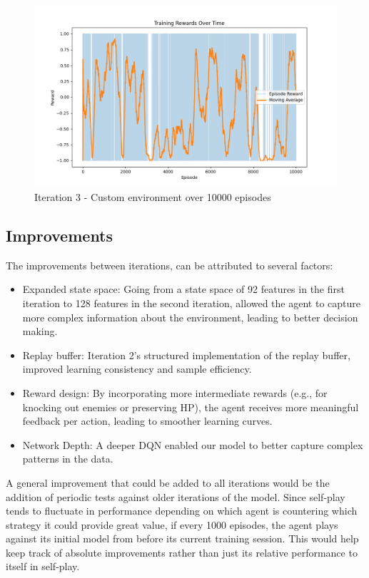 \begin{figure}[H]
    \centering
    \includegraphics[width=\textwidth]{assets/iteration-3-10k-rewards.png}
    \caption{Iteration 3 - Custom environment over 10000 episodes}
    \label{fig:iteration-3-graph}
\end{figure}

\subsection{Improvements}
The improvements between iterations, can be attributed to several factors:
\begin{itemize}
    \item Expanded state space: Going from a state space of 92 features in the first iteration
          to 128 features in the second iteration, allowed the agent to capture more complex information
          about the environment, leading to better decision making.
    \item Replay buffer: Iteration 2's structured implementation of the replay buffer, improved
          learning consistency and sample efficiency.
    \item Reward design: By incorporating more intermediate rewards (e.g., for knocking out enemies or preserving HP),
          the agent receives more meaningful feedback per action, leading to smoother learning curves.
    \item Network Depth: A deeper DQN enabled our model to better capture complex patterns in the data.
\end{itemize}

A general improvement that could be added to all iterations would be the addition of periodic tests against older iterations of the model.
Since self-play tends to fluctuate in performance depending on which agent is countering which strategy it could provide great value, if 
every 1000 episodes, the agent plays against its initial model from before its current training session. This would help keep track of 
absolute improvements rather than just its relative performance to itself in self-play.
